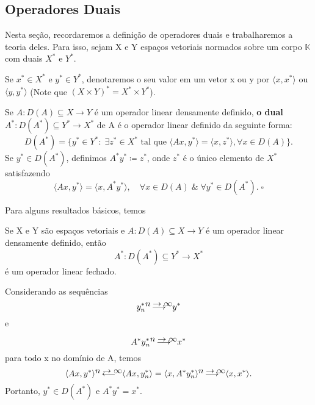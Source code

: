 \documentclass[../functional_analysis.tex]{subfiles}
\begin{document}
\subsection{Operadores Duais}
Nesta seção, recordaremos a definição de operadores duais e trabalharemos a teoria deles.
Para isso, sejam X e Y espaços vetoriais normados sobre um corpo \(\mathbb{K}\) com duais \(X^{*}\) e \(Y^{*}\).

Se \(x^{*}\in X^{*}\) e \(y^{*}\in Y^{*}\), denotaremos o seu valor em um vetor x ou y por \(\langle x, x^{*} \rangle\) ou \(\langle y, y^{*} \rangle\) (Note que \((X\times Y)^{*} = X^{*}\times Y^{*}\)).
\begin{def*}
	Se \(A:D(A)\subseteq X\rightarrow Y\) é um operador linear densamente definido, \textbf{o dual} \(A^{*}:D(A^{*})\subseteq Y^{*}\rightarrow X^{*}\) de A é o operador linear definido da seguinte forma:
	\[
		D(A^{*}) = \{y^{*}\in Y^{*}:\; \exists z^{*}\in X^{*} \text{ tal que } \langle Ax, y^{*} \rangle = \langle x, z^{*} \rangle, \forall x\in D(A)\}.
	\]
	Se \(y^{*}\in D(A^{*})\), definimos \(A^{*}y^{*}\coloneqq z^{*}\), onde \(z^{*}\) é o único elemento de \(X^{*}\) satisfazendo
	\[
		\langle Ax, y^{*} \rangle = \langle x, A^{*}y^{*} \rangle, \quad \forall x\in D(A)\;\&\; \forall y^{*}\in D(A^{*}).\; \square
	\]
\end{def*}
Para alguns resultados básicos, temos
\begin{prop*}
	Se X e Y são espaços vetoriais e \(A:D(A)\subseteq X\rightarrow Y\) é um operador linear densamente definido, então
	\[
		A^{*}:D(A^{*})\subseteq Y^{*}\rightarrow X^{*}
	\]
	é um operador linear fechado.
\end{prop*}
\begin{proof*}
	Considerando as sequências
	\[
		y_{n}^{*}\ensurestackMath{\stackon[0em]{\longrightarrow}{n\to \infty}}y^{*}
	\]
	e

	\[
		A^{*}y_{n}^{*}\ensurestackMath{\stackon[0em]{\longrightarrow}{n\to \infty}}x^{*}
	\]
	para todo x no domínio de A, temos
	\[
		\langle Ax, y^{*} \rangle \ensurestackMath{\stackon[0em]{\longleftarrow}{n\to \infty}} \langle Ax, y_{n}^{*} \rangle = \langle x, A^{*}y_{n}^{*} \rangle\ensurestackMath{\stackon[0em]{\longrightarrow}{n\to \infty}} \langle x, x^{*} \rangle.
	\]
	Portanto, \(y^{*}\in D(A^{*})\) e \(A^{*}y^{*} = x^{*}.\) \qedsymbol
\end{proof*}
\end{document}
